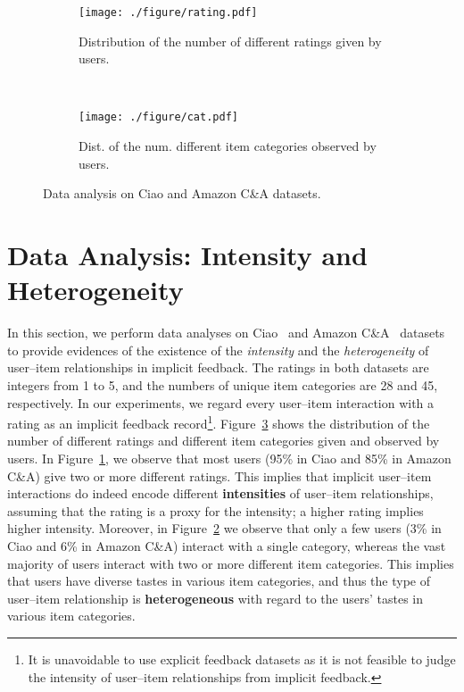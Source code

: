 \documentclass[conference]{IEEEtran}
\begin{document}
\captionsetup[sub]{textfont=normalfont}
\begin{figure}[h]
	\centering
	\begin{subfigure}{\linewidth}\centering\captionsetup{width=\linewidth}\texttt{[image: ./figure/rating.pdf]}\caption{Distribution of the number of different ratings given by users.}
		\label{fig:analysis:rating}
	\end{subfigure}
	\\
	\begin{subfigure}{\linewidth}\centering\captionsetup{width=\linewidth}\texttt{[image: ./figure/cat.pdf]}\caption{Dist. of the num. different item categories observed by users.}
		\label{fig:analysis:category}
	\end{subfigure}
\caption{Data analysis on Ciao and Amazon C\&A datasets.}
	\label{fig:analysis}
	\vspace{-1ex}
\end{figure}


\section{Data Analysis: \small Intensity and Heterogeneity}
\label{sec:Analysis}
In this section, we perform data analyses on Ciao~\cite{tang-etal12a} and Amazon C\&A~\cite{he2016ups} datasets to provide evidences of the existence of the \textit{intensity} and the \textit{heterogeneity} of user--item relationships in implicit feedback.
The ratings in both datasets are integers from 1 to 5, and the numbers of unique item categories are 28 and 45, respectively. In our experiments, we regard every user--item interaction with a rating as an implicit feedback record\footnote{It is unavoidable to use explicit feedback datasets as it is not feasible to judge the intensity of user--item relationships from implicit feedback.}.
Figure~\ref{fig:analysis} shows the distribution of the number of different ratings and different item categories given and observed by users.
In Figure~\ref{fig:analysis:rating}, we observe that most users (95\% in Ciao and 85\% in Amazon C\&A) give two or more different ratings. This implies that implicit user--item interactions do indeed encode different \textbf{intensities} of user--item relationships, assuming that the rating is a proxy for the intensity; a higher rating implies higher intensity. Moreover, in Figure~\ref{fig:analysis:category} we observe that only a few users (3\% in Ciao and 6\% in Amazon C\&A) interact with a single category, whereas the vast majority of users interact with two or more different item categories. This implies that users have diverse tastes in various item categories, and thus the type of user--item relationship is \textbf{heterogeneous} with regard to the users' tastes in various item
categories. 
\end{document}

